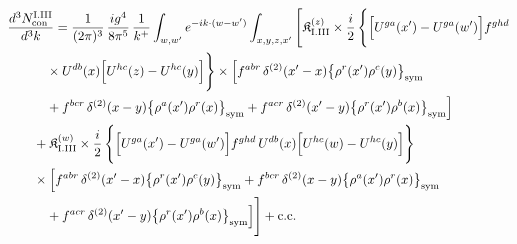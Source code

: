 \begingroup\small
\begin{align}\label{eq:H-I.III-2}
&\frac{d^{3}N^{\rm I.III}_{{\rm con}}}{d^{3}k}=\frac{1}{(2\pi)^{3}}\, \frac{ig^{4}}{8\pi^{5}}\, \frac{1}{k^{+}} \int_{w,w'}e^{-ik\cdot(w-w')} \int_{x,y,z,x'}\Bigg[ \mathfrak{K}^{(z)}_{\rm I.III} \times \frac{i}{2}\, \Bigg\{\Big[U^{ga}(x')-U^{ga}(w')\Big]f^{ghd}\notag\\
&\quad\quad\quad \times U^{db}(x)\Big[U^{hc}(z)-U^{hc}(y)\Big]\Bigg\} \times\Big[f^{abr}\, \delta^{(2)}(x'-x)\big\{\rho^{r}(x')\rho^{c}(y)\big\}_{\rm sym}\notag\\
&\quad\quad\quad +f^{bcr}\, \delta^{(2)}(x-y)\big\{\rho^{a}(x')\rho^{r}(x)\big\}_{\rm sym} +f^{acr}\, \delta^{(2)}(x'-y)\big\{\rho^{r}(x')\rho^{b}(x)\big\}_{\rm sym}\Big]\notag\\
&\quad\quad + \mathfrak{K}^{(w)}_{\rm I.III} \times \frac{i}{2}\, \Bigg\{\Big[U^{ga}(x')-U^{ga}(w')\Big]f^{ghd}\, U^{db}(x)\Big[U^{hc}(w)-U^{hc}(y)\Big]\Bigg\}\notag\\
&\quad\quad \times\Big[f^{abr}\, \delta^{(2)}(x'-x)\big\{\rho^{r}(x')\rho^{c}(y)\big\}_{\rm sym} +f^{bcr}\, \delta^{(2)}(x-y)\big\{\rho^{a}(x')\rho^{r}(x)\big\}_{\rm sym}\notag\\
&\quad\quad\quad +f^{acr}\, \delta^{(2)}(x'-y)\big\{\rho^{r}(x')\rho^{b}(x)\big\}_{\rm sym}\Big]\Bigg] +{\rm c.c.}
\end{align}
\endgroup
